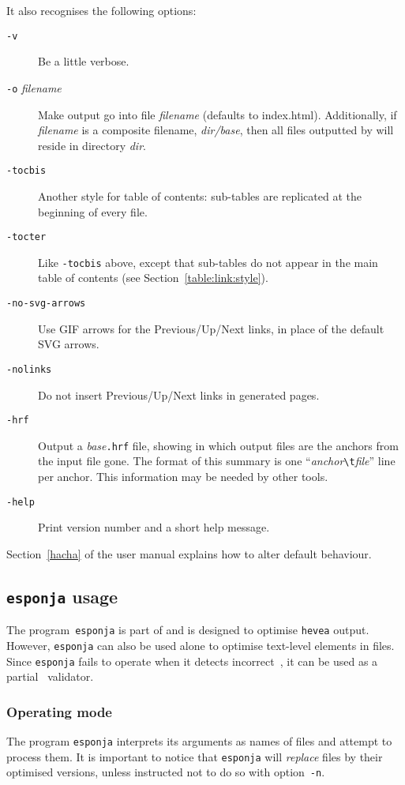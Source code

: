 It also recognises the following options:
\begin{description}
\item[{\tt -v}] Be a little verbose.
\item[{\tt -o} {\it filename}] Make \hacha{} output go into file
\textit{filename} (defaults  to index.html).
Additionally, if \textit{filename} is a composite filename,
\textit{dir/base}, then all files outputted by \hacha{} will
reside in directory \textit{dir}.
\item[{\tt -tocbis}]
Another style for table of contents:
sub-tables are replicated at the beginning of
every file.
\item[{\tt -tocter}]
Like \texttt{-tocbis} above, except that
sub-tables do not appear in the main table of contents
(see Section~\ref{table:link:style}).
\item[{\tt -no-svg-arrows}] Use GIF arrows for the Previous/Up/Next links,
in place of the default SVG arrows.
\item[{\tt -nolinks}] Do not insert Previous/Up/Next links in
generated pages.
\item[{\tt -hrf}] Output a \textit{base}\texttt{.hrf} file, showing
in which output files are the anchors from the input file gone.
The format of this summary is one
``\textit{anchor}\verb+\t+\textit{file}'' line per anchor.
This information may be needed by other tools.
\item[{\tt -help}] Print version number and a short help message.
\end{description}

\noindent Section~\ref{hacha} of the user manual explains how to
alter \hacha{} default behaviour.

\subsection{\texttt{esponja} usage}\label{esponjausage}
The program~\texttt{esponja}
is part of \hevea{} and is designed to optimise \texttt{hevea}
output.
However, \texttt{esponja} can also be used alone to optimise
text-level elements in \html{} files.
Since \texttt{esponja} fails
to operate when it detects incorrect~\html, it can be used as a
partial \html~validator.


\subsubsection{Operating mode}
The program \texttt{esponja} interprets its arguments as names of
files and attempt to process them.
It is important to notice that \texttt{esponja} will \emph{replace} files
by their optimised versions, unless instructed not to do so with
option~\texttt{-n}.

